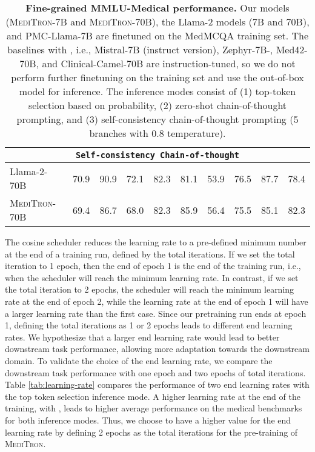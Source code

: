 \documentclass{article}
\newcommand{\llama}{\textnormal{Llama}}
\newcommand{\mtron}{\textsc{MediTron}\xspace}
\newcommand{\mtrona}{\textsc{MediTron-7B}\xspace}
\newcommand{\mtronb}{\textsc{MediTron-70B}\xspace}
\begin{document}
\begin{table}[t]
{\begin{tabular}{lccccccccc}
        \multicolumn{10}{c}{\texttt{Self-consistency Chain-of-thought}} \\ \midrule
        \llama-2-70B & 70.9 & 90.9 & 72.1 & 82.3 & 81.1 & 53.9 & 76.5 & 87.7 & 78.4 \\
        \mtronb & 69.4 & 86.7 & 68.0 & 82.3 & 85.9 & 56.4 & 75.5 & 85.1 & 82.3 \\
        \bottomrule
    \end{tabular}
    }
    \caption{\textbf{Fine-grained MMLU-Medical performance.} Our models (\mtrona and \mtronb), the \llama-2 models (7B and 70B), and PMC-\llama-7B are finetuned on the MedMCQA training set. The baselines with , i.e., Mistral-7B (instruct version), Zephyr-7B-, Med42-70B, and Clinical-Camel-70B are instruction-tuned, so we do not perform further finetuning on the training set and use the out-of-box model for inference. The inference modes consist of (1) top-token selection based on probability,  (2) zero-shot chain-of-thought prompting, and (3) self-consistency chain-of-thought prompting (5 branches with 0.8 temperature).} 
    \label{tab:mmlu-medical}
    \vspace{-4mm}
\end{table}

The cosine scheduler reduces the learning rate to a pre-defined minimum number at the end of a training run, defined by the total iterations. If we set the total iteration to 1 epoch, then the end of epoch 1 is the end of the training run, i.e., when the scheduler will reach the minimum learning rate. In contrast, if we set the total iteration to 2 epochs, the scheduler will reach the minimum learning rate at the end of epoch 2, while the learning rate at the end of epoch 1 will have a larger learning rate than the first case. Since our pretraining run ends at epoch 1, defining the total iterations as 1 or 2 epochs leads to different end learning rates. We hypothesize that a larger end learning rate would lead to better downstream task performance, allowing more adaptation towards the downstream domain. To validate the choice of the end learning rate, we compare the downstream task performance with one epoch and two epochs of total iterations. Table \ref{tab:learning-rate} compares the performance of two end learning rates with the top token selection inference mode. A higher learning rate at the end of the training, with , leads to higher average performance on the medical benchmarks for both inference modes. Thus, we choose to have a higher value for the end learning rate by defining 2 epochs as the total iterations for the pre-training of \mtron.
\end{document}
